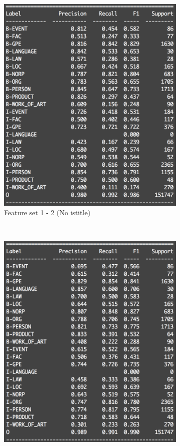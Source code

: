 \documentclass[a4paper]{article}
\begin{document}
\begin{spacing}{1.5}
  \begin{figure}[t!]
    \centering
    \begin{subfigure}[t]{0.5\textwidth}
      \centering
      \includegraphics[width=\linewidth]{log_no_title}
      \caption{Feature set 1 - 2 (No istitle)}
    \end{subfigure}%
    ~ 
    \begin{subfigure}[t]{0.5\textwidth}
      \centering
      \includegraphics[width=\linewidth]{log_no_postag}

\end{subfigure}
\end{figure}
\end{spacing}
\end{document}
